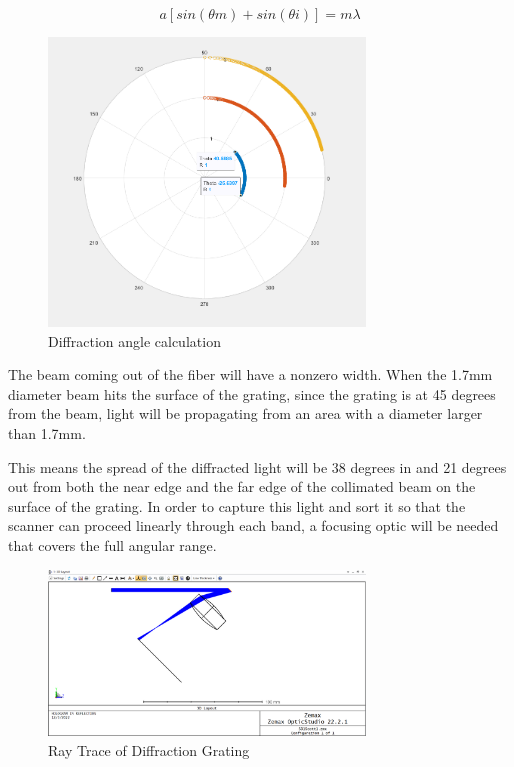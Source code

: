 \begin{equation}
    a[sin(\theta m)+sin(\theta i)] = m\lambda
\end{equation}

\begin{figure}[H]
    \caption{Diffraction angle calculation}
    \centering
    \includegraphics[width=0.75\textwidth]{images/DiffractionAngleCalculator.png}
\end{figure}

The beam coming out of the fiber will have a nonzero width. When the 1.7mm diameter beam hits the surface of the grating, since the grating is at 45 degrees from the beam, light will be propagating from an area with a diameter larger than 1.7mm.


This means the spread of the diffracted light will be 38 degrees in and 21 degrees out from both the near edge and the far edge of the collimated beam on the surface of the grating. In order to capture this light and sort it so that the scanner can proceed linearly through each band, a focusing optic will be needed that covers the full angular range.

\begin{figure}[H]
    \caption{Ray Trace of Diffraction Grating}
    \centering
    \includegraphics[width=0.75\textwidth]{images/Zemax Ray Trace.png}
\end{figure}

